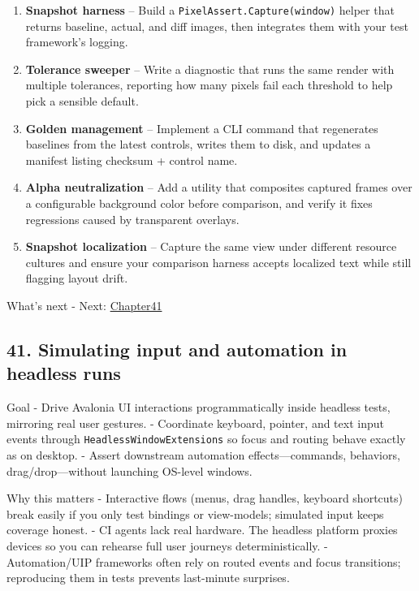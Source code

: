 \begin{enumerate}
\def\labelenumi{\arabic{enumi}.}
\tightlist
\item
  \textbf{Snapshot harness} -- Build a
  \passthrough{\lstinline!PixelAssert.Capture(window)!} helper that
  returns baseline, actual, and diff images, then integrates them with
  your test framework's logging.
\item
  \textbf{Tolerance sweeper} -- Write a diagnostic that runs the same
  render with multiple tolerances, reporting how many pixels fail each
  threshold to help pick a sensible default.
\item
  \textbf{Golden management} -- Implement a CLI command that regenerates
  baselines from the latest controls, writes them to disk, and updates a
  manifest listing checksum + control name.
\item
  \textbf{Alpha neutralization} -- Add a utility that composites
  captured frames over a configurable background color before
  comparison, and verify it fixes regressions caused by transparent
  overlays.
\item
  \textbf{Snapshot localization} -- Capture the same view under
  different resource cultures and ensure your comparison harness accepts
  localized text while still flagging layout drift.
\end{enumerate}

What's next - Next: \href{Chapter41.md}{Chapter41}

\newpage

\subsection{41. Simulating input and automation in headless
runs}\label{simulating-input-and-automation-in-headless-runs}

Goal - Drive Avalonia UI interactions programmatically inside headless
tests, mirroring real user gestures. - Coordinate keyboard, pointer, and
text input events through
\passthrough{\lstinline!HeadlessWindowExtensions!} so focus and routing
behave exactly as on desktop. - Assert downstream automation
effects---commands, behaviors, drag/drop---without launching OS-level
windows.

Why this matters - Interactive flows (menus, drag handles, keyboard
shortcuts) break easily if you only test bindings or view-models;
simulated input keeps coverage honest. - CI agents lack real hardware.
The headless platform proxies devices so you can rehearse full user
journeys deterministically. - Automation/UIP frameworks often rely on
routed events and focus transitions; reproducing them in tests prevents
last-minute surprises.


